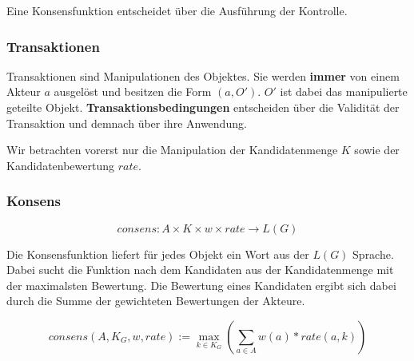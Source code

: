 \documentclass[]{article}
\begin{document}
Eine Konsensfunktion entscheidet über die Ausführung der Kontrolle.





% 



\subsubsection*{Transaktionen}

Transaktionen sind Manipulationen des Objektes. Sie werden \textbf{immer} von einem Akteur $a$ ausgelöst und besitzen die Form $(a, O')$. $O'$ ist dabei das manipulierte geteilte Objekt. \textbf{Transaktionsbedingungen} entscheiden über die Validität der Transaktion und demnach über ihre Anwendung.

Wir betrachten vorerst nur die Manipulation der Kandidatenmenge $K$ sowie der Kandidatenbewertung $rate$. 



\subsubsection*{Konsens}

  \[consens: A\times K\times w \times rate \rightarrow L(G)\] 


Die Konsensfunktion liefert für jedes Objekt ein Wort aus der $L(G)$ Sprache.
Dabei sucht die Funktion nach dem Kandidaten aus der Kandidatenmenge mit der maximalsten Bewertung. Die Bewertung eines Kandidaten ergibt sich dabei durch die Summe der gewichteten Bewertungen der Akteure.

\[ consens (A,K_G,w,rate) := \max_{k\in K_G} ( \sum_{a\in A} w(a) * rate(a,k) ) \] 
\end{document}
